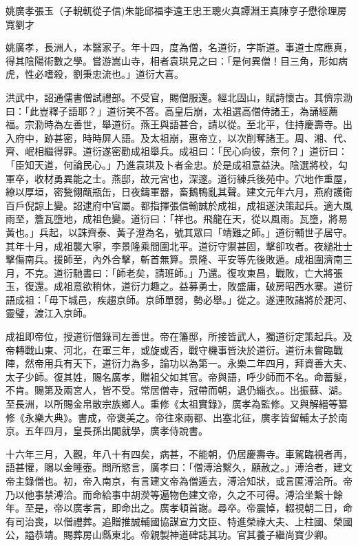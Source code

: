 
\begin{pinyinscope}
姚廣孝張玉（子輗軏從子信)朱能邱福李遠王忠王聰火真譚淵王真陳亨子懋徐理房寬劉才

姚廣孝，長洲人，本醫家子。年十四，度為僧，名道衍，字斯道。事道士席應真，得其陰陽術數之學。嘗游嵩山寺，相者袁珙見之曰：「是何異僧！目三角，形如病虎，性必嗜殺，劉秉忠流也。」道衍大喜。

洪武中，詔通儒書僧試禮部。不受官，賜僧服還。經北固山，賦詩懷古。其儕宗泐曰：「此豈釋子語耶？」道衍笑不答。高皇后崩，太祖選高僧侍諸王，為誦經薦福。宗泐時為左善世，舉道衍。燕王與語甚合，請以從。至北平，住持慶壽寺。出入府中，跡甚密，時時屏人語。及太祖崩，惠帝立，以次削奪諸王。周、湘、代、齊、岷相繼得罪。道衍遂密勸成祖舉兵。成祖曰：「民心向彼，奈何？」道衍曰：「臣知天道，何論民心。」乃進袁珙及卜者金忠。於是成祖意益決。陰選將校，勾軍卒，收材勇異能之士。燕邸，故元宮也，深邃。道衍練兵後苑中。穴地作重屋，繚以厚垣，密甃翎甋瓶缶，日夜鑄軍器，畜鵝鴨亂其聲。建文元年六月，燕府護衛百戶倪諒上變。詔逮府中官屬。都指揮張信輸誠於成祖，成祖遂決策起兵。適大風雨至，簷瓦墮地，成祖色變。道衍曰：「祥也。飛龍在天，從以風雨。瓦墮，將易黃也。」兵起，以誅齊泰、黃子澄為名，號其眾曰「靖難之師。」道衍輔世子居守。其年十月，成祖襲大寧，李景隆乘間圍北平。道衍守禦甚固，擊卻攻者。夜縋壯士擊傷南兵。援師至，內外合擊，斬首無算。景隆、平安等先後敗遁。成祖圍濟南三月，不克。道衍馳書曰：「師老矣，請班師。」乃還。復攻東昌，戰敗，亡大將張玉，復還。成祖意欲稍休，道衍力趣之。益募勇士，敗盛庸，破房昭西水寨。道衍語成祖：「毋下城邑，疾趨京師。京師單弱，勢必舉。」從之。遂連敗諸將於淝河、靈璧，渡江入京師。

成祖即帝位，授道衍僧錄司左善世。帝在籓邸，所接皆武人，獨道衍定策起兵。及帝轉戰山東、河北，在軍三年，或旋或否，戰守機事皆決於道衍。道衍未嘗臨戰陣，然帝用兵有天下，道衍力為多，論功以為第一。永樂二年四月，拜資善大夫、太子少師。復其姓，賜名廣孝，贈祖父如其官。帝與語，呼少師而不名。命蓄髮，不肯。賜第及兩宮人，皆不受。常居僧寺，冠帶而朝，退仍緇衣。。出振蘇、湖。至長洲，以所賜金帛散宗族鄉人。重修《太祖實錄》，廣孝為監修。又與解縉等纂修《永樂大典》。書成，帝褒美之。帝往來兩都、出塞北征，廣孝皆留輔太子於南京。五年四月，皇長孫出閣就學，廣孝侍說書。

十六年三月，入觀，年八十有四矣，病甚，不能朝，仍居慶壽寺。車駕臨視者再，語甚懽，賜以金睡壺。問所慾言，廣孝曰：「僧溥洽繫久，願赦之。」溥洽者，建文帝主錄僧也。初，帝入南京，有言建文帝為僧遁去，溥洽知狀，或言匿溥洽所。帝乃以他事禁溥洽。而命給事中胡濙等遍物色建文帝，久之不可得。溥洽坐繫十餘年。至是，帝以廣孝言，即命出之。廣孝頓首謝。尋卒。帝震悼，輟視朝二日，命有司治喪，以僧禮葬。追贈推誠輔國協謀宣力文臣、特進榮祿大夫、上柱國、榮國公，謚恭靖。賜葬房山縣東北。帝親製神道碑誌其功。官其養子繼尚寶少卿。


\end{pinyinscope}
